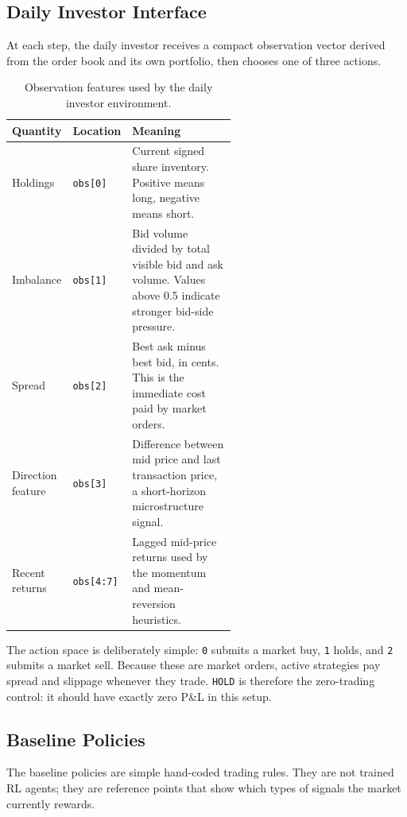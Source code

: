 \documentclass[11pt]{article}
\begin{document}
\subsection{Daily Investor Interface}

At each step, the daily investor receives a compact observation vector derived
from the order book and its own portfolio, then chooses one of three actions.

\begin{table}[H]
\centering
\small
\begin{tabular}{llp{0.56\linewidth}}
\toprule
Quantity & Location & Meaning \\
\midrule
Holdings & \texttt{obs[0]} & Current signed share inventory. Positive means long,
negative means short. \\
Imbalance & \texttt{obs[1]} & Bid volume divided by total visible bid and ask volume.
Values above 0.5 indicate stronger bid-side pressure. \\
Spread & \texttt{obs[2]} & Best ask minus best bid, in cents. This is the immediate
cost paid by market orders. \\
Direction feature & \texttt{obs[3]} & Difference between mid price and last
transaction price, a short-horizon microstructure signal. \\
Recent returns & \texttt{obs[4:7]} & Lagged mid-price returns used by the
momentum and mean-reversion heuristics. \\
\bottomrule
\end{tabular}
\caption{Observation features used by the daily investor environment.}
\label{tab:observation-context}
\end{table}

The action space is deliberately simple: \texttt{0} submits a market buy,
\texttt{1} holds, and \texttt{2} submits a market sell. Because these are market
orders, active strategies pay spread and slippage whenever they trade.
\texttt{HOLD} is therefore the zero-trading control: it should have exactly zero
P\&L in this setup.

\subsection{Baseline Policies}

The baseline policies are simple hand-coded trading rules. They are not trained
RL agents; they are reference points that show which types of signals the market
currently rewards.
\end{document}
